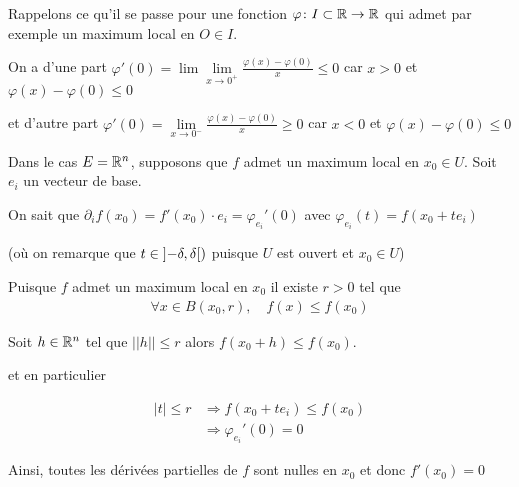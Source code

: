 \documentclass[french,a4paper,10pt]{article}
\begin{document}
	\begin{myproof}
		Rappelons ce qu'il se passe pour une fonction $\varphi\colon I\subset \mathbb{R}\to\mathbb{R}$ qui admet par exemple un maximum local en $O\in I$.
		
		On a d'une part $\varphi'(0)=\lim\lim\limits_{x\to0^+}\frac{\varphi(x)-\varphi(0)}x\le 0$
		car $x>0$ et $\varphi(x)-\varphi(0)\le 0$
		
		et d'autre part $\varphi'(0)=\lim\limits_{x\to0^-}\frac{\varphi(x)-\varphi(0)}x\ge 0$ car $x<0$ et $\varphi(x)-\varphi(0)\le 0$
		
		Dans le cas $E=\mathbb{R}^n$, supposons que $f$ admet un maximum local en $x_0\in U$. Soit $e_i$ un vecteur de base.
		
		On sait que $\partial_i f(x_0)=f'(x_0)\cdot e_i=\varphi_{e_i}'(0)$ avec $\varphi_{e_i}(t)=f(x_0+te_i)$
		
		(où on remarque que $t\in\mathopen{]}-\delta,\delta\mathclose{[})$ puisque $U$ est ouvert et $x_0\in U$)
		
		Puisque $f$ admet un maximum local en $x_0$ il existe $r>0$ tel que
		\[\begin{aligned}
			\forall x\in B(x_0, r),\quad f(x)\le f(x_0)
		\end{aligned}\]
	
		Soit $h\in\mathbb{R}^n$ tel que $||h||\le r$ alors $f(x_0+h)\le f(x_0)$.
		
		et en particulier
		
		\[\begin{aligned}
			|t|\le r&\Longrightarrow f(x_0+t e_i)\le f(x_0)\\
			&\Longrightarrow\varphi_{e_i}'(0)=0
		\end{aligned}\]
	
		Ainsi, toutes les dérivées partielles de $f$ sont nulles en $x_0$ et donc $f'(x_0)=0$
		
	\end{myproof}
\end{document}
